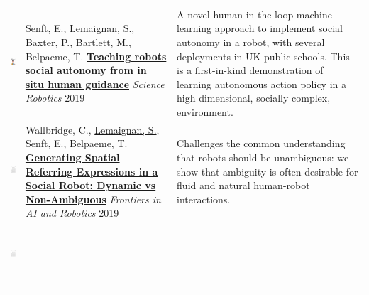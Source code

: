 \documentclass[11pt,a4paper]{report}
\begin{document}
\hspace*{-0.5cm}\begin{tabular}{p{1.7cm}p{7cm}p{8cm}}

    \vspace{-0.2cm}\includegraphics[height=2.2cm]{thumbs/2019-science.png} & Senft, E.,
    \ul{Lemaignan, S.}, Baxter, P., Bartlett, M., Belpaeme, T.
    \newline\href{https://doi.org/10.1126/scirobotics.aat1186}{\textbf{Teaching robots
    social autonomy from in situ human guidance}}
    \newline \textit{Science Robotics} 2019
    & \small A novel human-in-the-loop machine learning approach
    to implement social autonomy in a robot, with several deployments in UK
    public schools. This is a first-in-kind demonstration of learning autonomous
    action policy in a high dimensional, socially complex,
    environment.\textbf{} \\


    \vspace{-.20cm}\includegraphics[height=2.2cm]{thumbs/2019-frontiers-chris.jpg} &

    Wallbridge, C., \ul{Lemaignan, S.}, Senft, E., Belpaeme, T.  
    \newline\href{https://doi.org/10.3389/frobt.2019.00067}{\textbf{Generating
    Spatial Referring Expressions in a Social Robot: Dynamic vs Non-Ambiguous}}
    \newline \textit{Frontiers in AI and Robotics} 2019
    & \small Challenges the common understanding that robots should be
    unambiguous: we show that ambiguity is often desirable for fluid and natural
    human-robot interactions.\textbf{}  \\

    \vspace{-.20cm}\includegraphics[height=2.2cm]{thumbs/2019-frontiers-maddy.jpg} &


\end{tabular}
\end{document}
